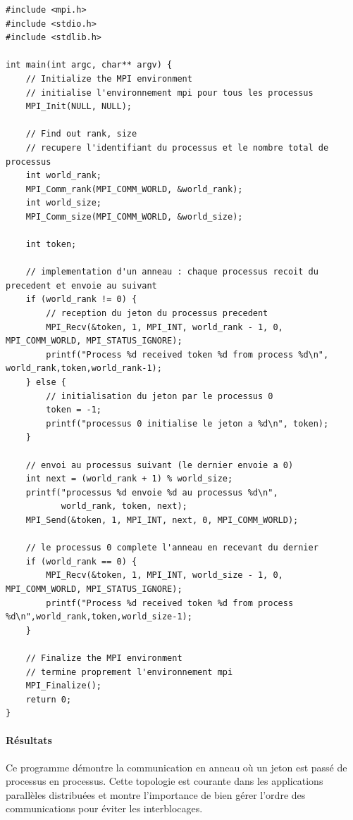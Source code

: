 \documentclass[a4paper,11pt]{article}
\begin{document}
\begin{lstlisting}[caption=Exercice 3 : Communication en anneau]
#include <mpi.h> 
#include <stdio.h> 
#include <stdlib.h> 

int main(int argc, char** argv) {
    // Initialize the MPI environment
    // initialise l'environnement mpi pour tous les processus
    MPI_Init(NULL, NULL);

    // Find out rank, size
    // recupere l'identifiant du processus et le nombre total de processus
    int world_rank;
    MPI_Comm_rank(MPI_COMM_WORLD, &world_rank);
    int world_size;
    MPI_Comm_size(MPI_COMM_WORLD, &world_size);

    int token;

    // implementation d'un anneau : chaque processus recoit du precedent et envoie au suivant
    if (world_rank != 0) {
        // reception du jeton du processus precedent
        MPI_Recv(&token, 1, MPI_INT, world_rank - 1, 0, MPI_COMM_WORLD, MPI_STATUS_IGNORE);
        printf("Process %d received token %d from process %d\n", world_rank,token,world_rank-1);
    } else {
        // initialisation du jeton par le processus 0
        token = -1;
        printf("processus 0 initialise le jeton a %d\n", token);
    }

    // envoi au processus suivant (le dernier envoie a 0)
    int next = (world_rank + 1) % world_size;
    printf("processus %d envoie %d au processus %d\n", 
           world_rank, token, next);
    MPI_Send(&token, 1, MPI_INT, next, 0, MPI_COMM_WORLD);

    // le processus 0 complete l'anneau en recevant du dernier
    if (world_rank == 0) {
        MPI_Recv(&token, 1, MPI_INT, world_size - 1, 0, MPI_COMM_WORLD, MPI_STATUS_IGNORE);
        printf("Process %d received token %d from process %d\n",world_rank,token,world_size-1);
    }

    // Finalize the MPI environment
    // termine proprement l'environnement mpi
    MPI_Finalize();
    return 0;
}
\end{lstlisting}

\paragraph{Résultats} Ce programme démontre la communication en anneau où un jeton est passé de processus en processus. Cette topologie est courante dans les applications parallèles distribuées et montre l'importance de bien gérer l'ordre des communications pour éviter les interblocages.
\end{document}
